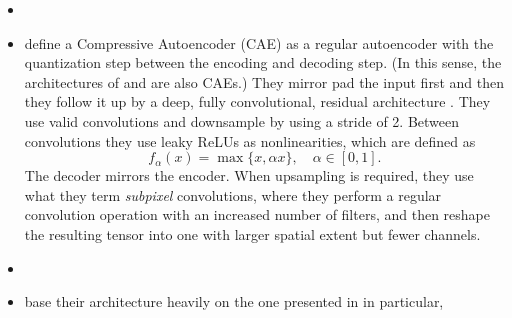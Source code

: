 \documentclass{article}
\begin{document}
\begin{itemize}
\item \cite{toderici2017full}
\item \cite{theis2017lossy} define a Compressive Autoencoder (CAE) as a regular
  autoencoder with the quantization step between the encoding and decoding step.
  (In this sense, the architectures of \cite{balle2016end} and
  \cite{balle2018variational} are also CAEs.) They mirror pad the input first
  and then they follow it up by a deep, fully convolutional, residual
  architecture \cite{he2016deep}. They use valid convolutions and downsample by
  using a stride of 2. Between convolutions they use leaky ReLUs as
  nonlinearities, which are defined as 
  \[
    f_\alpha(x) = \max\{x, \alpha x\}, \quad \alpha \in [0, 1].
  \]
  The decoder mirrors the encoder. When upsampling is required, they use what
  they term \textit{subpixel} convolutions, where they perform a regular
  convolution operation with an increased number of filters, and then reshape
  the resulting tensor into one with larger spatial extent but fewer channels.
\item \cite{rippel2017real}
\item \cite{balle2018variational} base their architecture heavily on the one
  presented in \cite{balle2016end} in particular,
\end{itemize}
\end{document}
